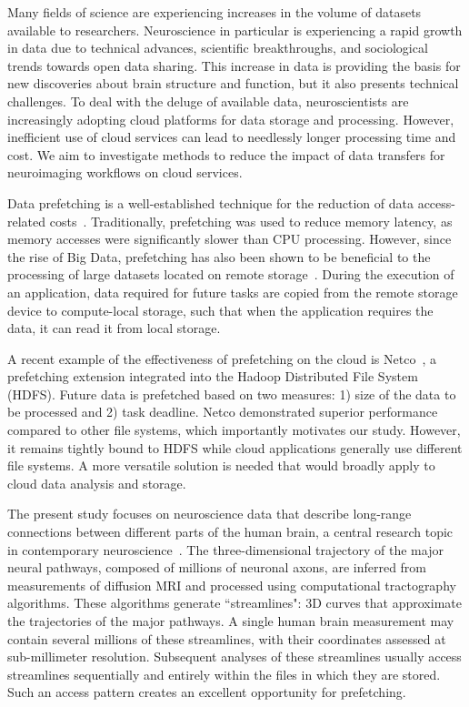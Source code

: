 Many fields of science are experiencing increases in the volume of datasets
available to researchers. Neuroscience in particular is experiencing a rapid
growth in data due to technical advances, scientific breakthroughs, and
sociological trends towards open data sharing. This increase in data is
providing the basis for new discoveries about brain structure and function, but
it also presents technical challenges. To deal with the deluge of available
data, neuroscientists are increasingly adopting cloud platforms for data storage
and processing. However, inefficient use of cloud services can lead to
needlessly longer processing time and cost. We aim to investigate methods to
reduce the impact of data transfers for neuroimaging workflows on cloud
services.

Data prefetching is a well-established technique for the reduction of data
access-related costs~\cite{callahan1991software, mowry1992design,
klaiber1991architecture}. Traditionally, prefetching was used to reduce memory
latency, as memory accesses were significantly slower than CPU processing.
However, since the rise of Big Data, prefetching has also been shown to be
beneficial to the processing of large datasets located on remote
storage~\cite{yildiz2018improving}. During the execution of an application, data
required for future tasks are copied from the remote storage device to
compute-local storage, such that when the application requires the data, it can
read it from local storage.

A recent example of the effectiveness of prefetching on the cloud is
Netco~\cite{jalaparti2018netco}, a prefetching extension integrated into the
Hadoop Distributed File System (HDFS). Future data is prefetched based on two
measures: 1) size of the data to be processed and 2) task deadline.  Netco
demonstrated superior performance compared to other file systems, which
importantly motivates our study. However, it remains tightly bound to HDFS while
cloud applications generally use different file systems. A more versatile
solution is needed that would broadly apply to cloud data analysis and storage.

The present study focuses on neuroscience data that describe long-range
connections between different parts of the human brain, a central research topic
in contemporary neuroscience~\cite{bassett_network_2017}. The three-dimensional
trajectory of the major neural pathways, composed of millions of neuronal axons,
are inferred from measurements of diffusion MRI and processed using
computational tractography algorithms. These algorithms generate ``streamlines":
3D curves that approximate the trajectories of the major pathways. A single
human brain measurement may contain several millions of these streamlines, with
their coordinates assessed at sub-millimeter resolution. Subsequent analyses of
these streamlines usually access streamlines sequentially and entirely within
the files in which they are stored. Such an access pattern creates an excellent
opportunity for prefetching.


